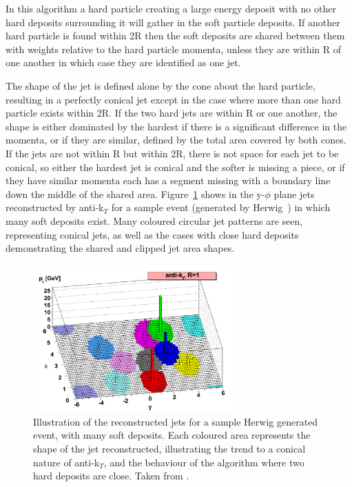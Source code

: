 In this algorithm a hard particle creating a large energy deposit with no other hard deposits surrounding it will gather in the soft particle deposits. If another hard particle is found within 2R then the soft deposits are shared between them with weights relative to the hard particle momenta, unless they are within R of one another in which case they are identified as one jet. 

The shape of the jet is defined alone by the cone about the hard particle, resulting in a perfectly conical jet except in the case where more than one hard particle exists within 2R. If the two hard jets are within R or one another, the shape is either dominated by the hardest if there is a significant difference in the momenta, or if they are similar, defined by the total area covered by both cones. If the jets are not within R but within 2R, there is not space for each jet to be conical, so either the hardest jet is conical and the softer is missing a piece, or if they have similar momenta each has a segment missing with a boundary line down the middle of the shared area. Figure~\ref{fig:akt} shows in the y-$\phi$ plane jets reconstructed by anti-k$_{T}$ for a sample event (generated by Herwig~\cite{HERWIG}) in which many soft deposits exist. Many coloured circular jet patterns are seen, representing conical jets, as well as the cases with close hard deposits demonstrating the shared and clipped jet area shapes. 

\begin{figure}
\centering
\includegraphics[width=0.7\textwidth]{Figures/Objects/akt}
\caption[Illustration of the reconstructed jets for a sample Herwig generated event, with many soft deposits.]{\label{fig:akt}Illustration of the reconstructed jets for a sample Herwig generated event, with many soft deposits. Each coloured area represents the shape of the jet reconstructed, illustrating the trend to a conical nature of anti-k$_{T}$, and the behaviour of the algorithm where two hard deposits are close. Taken from \cite{akt}.}
\end{figure}

